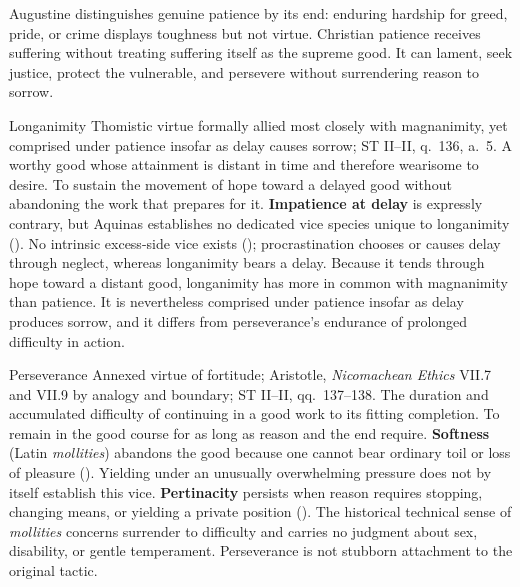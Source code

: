 Augustine distinguishes genuine patience by its end: enduring hardship for greed, pride, or crime displays toughness but not virtue. Christian patience receives suffering without treating suffering itself as the supreme good. It can lament, seek justice, protect the vulnerable, and persevere without surrendering reason to sorrow.

\virtuedossier
  {Longanimity}
  {Thomistic virtue formally allied most closely with magnanimity, yet comprised under patience insofar as delay causes sorrow; ST II--II, q.~136, a.~5.}
  {A worthy good whose attainment is distant in time and therefore wearisome to desire.}
  {To sustain the movement of hope toward a delayed good without abandoning the work that prepares for it.}
  {\textbf{Impatience at delay} is expressly contrary, but Aquinas establishes no dedicated vice species unique to longanimity ().}
  {No intrinsic excess-side vice exists (); procrastination chooses or causes delay through neglect, whereas longanimity bears a delay.}
  {Because it tends through hope toward a distant good, longanimity has more in common with magnanimity than patience. It is nevertheless comprised under patience insofar as delay produces sorrow, and it differs from perseverance's endurance of prolonged difficulty in action.}

\virtuedossier
  {Perseverance}
  {Annexed virtue of fortitude; Aristotle, \emph{Nicomachean Ethics} VII.7 and VII.9 by analogy and boundary; ST II--II, qq.~137--138.}
  {The duration and accumulated difficulty of continuing in a good work to its fitting completion.}
  {To remain in the good course for as long as reason and the end require.}
  {\textbf{Softness} (Latin \emph{mollities}) abandons the good because one cannot bear ordinary toil or loss of pleasure (). Yielding under an unusually overwhelming pressure does not by itself establish this vice.}
  {\textbf{Pertinacity} persists when reason requires stopping, changing means, or yielding a private position ().}
  {The historical technical sense of \emph{mollities} concerns surrender to difficulty and carries no judgment about sex, disability, or gentle temperament. Perseverance is not stubborn attachment to the original tactic.}

